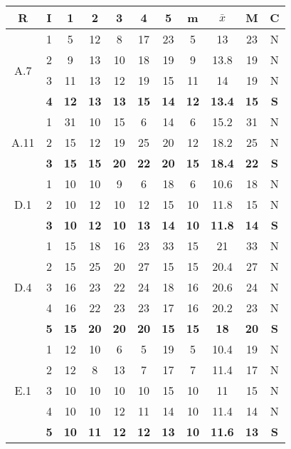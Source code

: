 \documentclass[11pt,a4paper,spanish,twoside]{book}
\begin{document}
\begin{table}[!h]
  \centering
  \begin{tabular}{|c|c||c|c|c|c|c||c|c|c||c|}
    \hline
    \textbf{R} & \textbf{I} & \textbf{1} & \textbf{2} & 
    \textbf{3} & \textbf{4} & \textbf{5} & \textbf{m} &
    \textbf{$\bar{x}$} & \textbf{M} & \textbf{C} \\
    \hline \hline

    \hline \multirow{4}{*}{A.7} 
    & 1 & 5  & 12 & 8  & 17 & 23 & 5  & 13   & 23 & N \\
    & 2 & 9  & 13 & 10 & 18 & 19 & 9  & 13.8 & 19 & N \\
    & 3 & 11 & 13 & 12 & 19 & 15 & 11 & 14   & 19 & N \\
    & \textbf{4} & \textbf{12} & \textbf{13} & \textbf{13} & \textbf{15} &
    \textbf{14} & \textbf{12} & \textbf{13.4} & \textbf{15} & \textbf{S} \\ 

    \hline \multirow{3}{*}{A.11} 
    & 1 & 31 & 10 & 15 & 6  & 14 & 6  & 15.2 & 31 & N \\
    & 2 & 15 & 12 & 19 & 25 & 20 & 12 & 18.2 & 25 & N \\
    & \textbf{3} & \textbf{15} & \textbf{15} & \textbf{20} & \textbf{22} &
    \textbf{20} & \textbf{15} & \textbf{18.4} & \textbf{22} & \textbf{S} \\ 
    
    \hline \multirow{3}{*}{D.1} 
    & 1 & 10 & 10 & 9  & 6  & 18 & 6  & 10.6 & 18 & N \\
    & 2 & 10 & 12 & 10 & 12 & 15 & 10 & 11.8 & 15 & N \\
    & \textbf{3} & \textbf{10} & \textbf{12} & \textbf{10} & \textbf{13} &
    \textbf{14} & \textbf{10} & \textbf{11.8} & \textbf{14} & \textbf{S} \\ 
    
    \hline \multirow{5}{*}{D.4} 
    & 1 & 15 & 18 & 16 & 23 & 33 & 15 & 21   & 33 & N \\
    & 2 & 15 & 25 & 20 & 27 & 15 & 15 & 20.4 & 27 & N \\
    & 3 & 16 & 23 & 22 & 24 & 18 & 16 & 20.6 & 24 & N \\
    & 4 & 16 & 22 & 23 & 23 & 17 & 16 & 20.2 & 23 & N \\
    & \textbf{5} & \textbf{15} & \textbf{20} & \textbf{20} & \textbf{20} &
    \textbf{15} & \textbf{15} & \textbf{18} & \textbf{20} & \textbf{S} \\
    
    \hline \multirow{5}{*}{E.1} 
    & 1 & 12 & 10 & 6  & 5  & 19 & 5  & 10.4 & 19 & N \\
    & 2 & 12 & 8  & 13 & 7  & 17 & 7  & 11.4 & 17 & N \\
    & 3 & 10 & 10 & 10 & 10 & 15 & 10 & 11   & 15 & N \\
    & 4 & 10 & 10 & 12 & 11 & 14 & 10 & 11.4 & 14 & N \\
    & \textbf{5} & \textbf{10} & \textbf{11} & \textbf{12} & \textbf{12} &
    \textbf{13} & \textbf{10} & \textbf{11.6} & \textbf{13} & \textbf{S} \\ 
    

\end{tabular}
\end{table}
\end{document}
